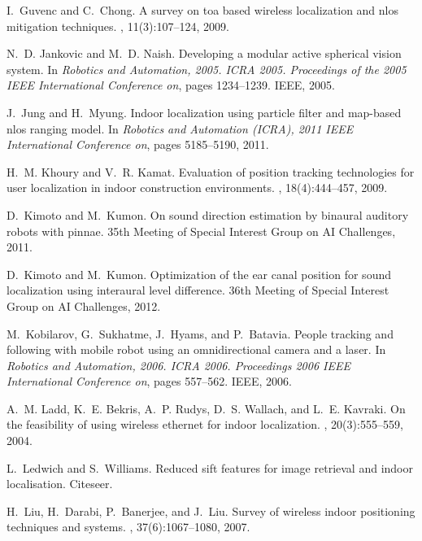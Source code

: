 \begin{thebibliography}{40}
I.~Guvenc and C.~Chong.
\newblock A survey on toa based wireless localization and nlos mitigation
  techniques.
, 11(3):107--124,
  2009.

N.~D. Jankovic and M.~D. Naish.
\newblock Developing a modular active spherical vision system.
\newblock In {\em Robotics and Automation, 2005. ICRA 2005. Proceedings of the
  2005 IEEE International Conference on}, pages 1234--1239. IEEE, 2005.

J.~Jung and H.~Myung.
\newblock Indoor localization using particle filter and map-based nlos ranging
  model.
\newblock In {\em Robotics and Automation (ICRA), 2011 IEEE International
  Conference on}, pages 5185--5190, 2011.

H.~M. Khoury and V.~R. Kamat.
\newblock Evaluation of position tracking technologies for user localization in
  indoor construction environments.
, 18(4):444--457, 2009.

D.~Kimoto and M.~Kumon.
\newblock On sound direction estimation by binaural auditory robots with
  pinnae.
\newblock 35th Meeting of Special Interest Group on AI Challenges, 2011.

D.~Kimoto and M.~Kumon.
\newblock Optimization of the ear canal position for sound localization using
  interaural level difference.
\newblock 36th Meeting of Special Interest Group on AI Challenges, 2012.

M.~Kobilarov, G.~Sukhatme, J.~Hyams, and P.~Batavia.
\newblock People tracking and following with mobile robot using an
  omnidirectional camera and a laser.
\newblock In {\em Robotics and Automation, 2006. ICRA 2006. Proceedings 2006
  IEEE International Conference on}, pages 557--562. IEEE, 2006.

A.~M. Ladd, K.~E. Bekris, A.~P. Rudys, D.~S. Wallach, and L.~E. Kavraki.
\newblock On the feasibility of using wireless ethernet for indoor
  localization.
, 20(3):555--559,
  2004.

L.~Ledwich and S.~Williams.
\newblock Reduced sift features for image retrieval and indoor localisation.
\newblock Citeseer.

H.~Liu, H.~Darabi, P.~Banerjee, and J.~Liu.
\newblock Survey of wireless indoor positioning techniques and systems.
, 37(6):1067--1080, 2007.


\end{thebibliography}
